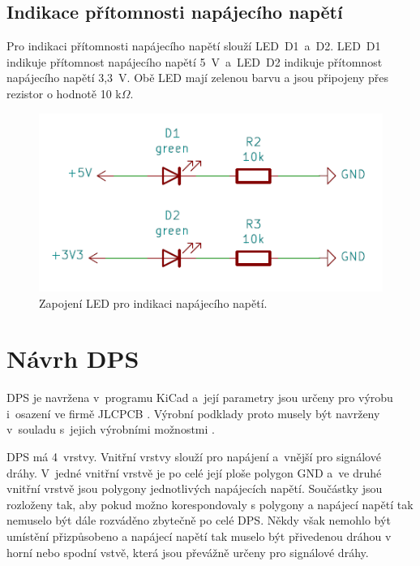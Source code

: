   \section{Indikace přítomnosti napájecího napětí}
  Pro indikaci přítomnosti napájecího napětí slouží LED~D1~a~D2. LED~D1 indikuje přítomnost napájecího napětí 
  5~V~a~LED~D2 indikuje přítomnost napájecího napětí 3,3~V. Obě LED mají zelenou barvu a jsou připojeny přes
  rezistor o hodnotě 10 k$\Omega$.

  \begin{figure}[!h]
    \begin{center}
      \includegraphics[scale=0.8]{obrazky/powerLED.png}
    \end{center}
    \caption[Zapojení LED pro indikaci napájecího napětí]{Zapojení LED pro indikaci napájecího napětí.}
  \end{figure}

  \chapter{Návrh DPS}
  DPS je navržena v~programu KiCad a~její parametry jsou určeny pro výrobu i~osazení ve firmě JLCPCB \cite{KiCad} \cite{JLCPCB}. Výrobní 
  podklady proto musely být navrženy v~souladu s~jejich výrobními možnostmi \cite{JLCPCB_Capabilities}.

  DPS má 4~vrstvy. Vnitřní vrstvy slouží pro napájení a~vnější pro signálové dráhy. V~jedné vnitřní vrstvě je po celé její ploše 
  polygon GND a~ve druhé vnitřní vrstvě jsou polygony jednotlivých napájecích napětí. Součástky jsou rozloženy tak, aby pokud možno
  korespondovaly s polygony a napájecí napětí tak nemuselo být dále rozváděno zbytečně po celé DPS. Někdy však nemohlo být umístění 
  přizpůsobeno a napájecí napětí tak muselo být přivedenou dráhou v horní nebo spodní vstvě, která jsou převážně určeny pro signálové 
  dráhy. 

